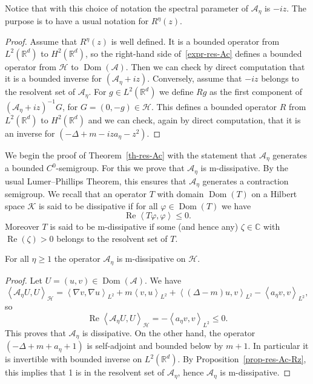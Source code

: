 \documentclass[10pt]{amsart}
\theoremstyle{definition}\newtheorem{defi}[theo]{Definition}\newtheorem{rema}[theo]{Remark}\newtheorem{exam}[theo]{Example}\newtheorem{exem}[theo]{Example}\newtheorem{nota}[theo]{Notation}
\newcommand{\innp}[2]{\left< #1, #2 \right>}
\renewcommand{\leq}{\leqslant}
\renewcommand{\geq}{\geqslant}
\newcommand{\inv}{^{-1}}
\newcommand{\1}{\mathds 1}
\DeclareMathOperator{\Reop}{Re}
\DeclareMathOperator{\Dom}{Dom}
\renewcommand{\Re}{\Reop}
\newcommand{\R}{\mathbb{R}}
\newcommand{\D}{\Delta}
\newcommand{\z}{\zeta}
\newcommand{\f}{\varphi}
\newcommand{\Ac}{{\mathcal A}}
\newcommand{\Kc}{{\mathcal K}}
\newcommand{\HH}{\mathcal H}
\begin{document}
Notice that with this choice of notation the spectral parameter of $\Ac_\eta$ is $-iz$. The purpose is to have a usual notation for $R^\eta(z)$.

\begin{proof}
Assume that $R^\eta(z)$ is well defined. It is a bounded operator from $L^2(\R^d)$ to $H^2(\R^d)$, so the right-hand side of~\eqref{expr-res-Ac} defines a bounded operator from $\HH$ to $\Dom(\Ac)$. Then we can check by direct computation that it is a bounded inverse for $(\Ac_\eta + iz)$. Conversely, assume that $-iz$ belongs to the resolvent set of $\Ac_\eta$. For $g \in L^2(\R^d)$ we define $Rg$ as the first component of $(\Ac_\eta + iz)\inv G$, for $G = (0,-g) \in \HH$. This defines a bounded operator $R$ from $L^2(\R^d)$ to $H^2(\R^d)$ and we can check, again by direct computation, that it is an inverse for ${(-\D + m - iza_\eta - z^2)}$.
\end{proof}

We begin the proof of Theorem~\ref{th-res-Ac} with the statement that $\Ac_\eta$ generates a bounded $C^0$-semigroup. For this we prove that $\Ac_\eta$ is \textsf{m}-dissipative. By the usual Lumer--Phillips Theorem, this ensures that $\Ac_\eta$ generates a contraction semigroup. We recall that an operator $T$ with domain $\Dom(T)$ on a Hilbert space $\Kc$ is said to be dissipative if for all $\f \in \Dom(T)$ we have
\[
\Re \innp{T\f}{\f} \leq 0.
\]
Moreover $T$ is said to be \textsf{m}-dissipative if some (and hence any) $\z \in \mathbb C$ with $\Re(\z) > 0$ belongs to the resolvent set of $T$.

\begin{prop}\label{prop-Ac-diss}
For all $\eta \geq 1$ the operator $\Ac_\eta$ is \textsf{m}-dissipative on $\HH$.
\end{prop}

\begin{proof}
Let $U = (u,v) \in \Dom(\Ac)$. We have
\[
\innp{\Ac_\eta U}{U}_\HH = \innp{\nabla v}{\nabla u}_{L^2} + m \innp{v}{u}_{L^2} + \innp{(\D - m) u}{v}_{L^2} - \innp{a_\eta v}{v}_{L^2},
\]
so
\[
\Re \innp{\Ac_\eta U}{U}_\HH = - \innp{a_\eta v}{v}_{L^2} \leq 0.
\]
This proves that $\Ac_\eta$ is dissipative. On the other hand, the operator $(-\D + m + a_\eta + 1)$ is self-adjoint and bounded below by $m+1$. In particular it is invertible with bounded inverse on $L^2(\R^d)$. By Proposition~\ref{prop-res-Ac-Rz}, this implies that 1 is in the resolvent set of $\Ac_\eta$, hence $\Ac_\eta$ is \textsf{m}-dissipative.
\end{proof}
\end{document}
